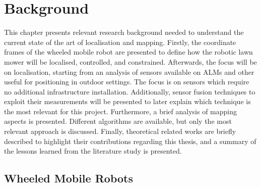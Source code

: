 \chapter{Background}
\label{ch:background}





\noindent This chapter presents relevant research background needed to understand the current state of the art of localisation and mapping.
Firstly, the coordinate frames of the wheeled mobile robot are presented to define how the robotic lawn mower will be localised, controlled, and constrained.
Afterwards, the focus will be on localisation, starting from an analysis of sensors available on \glspl{ALM} and other useful for positioning in outdoor settings.
The focus is on sensors which require no additional infrastructure installation.
Additionally, sensor fusion techniques to exploit their measurements will be presented to later explain which technique is the most relevant for this project.
Furthermore, a brief analysis of mapping aspects is presented.
Different algorithms are available, but only the most relevant approach is discussed.
Finally, theoretical related works are briefly described to highlight their contributions regarding this thesis, and a summary of the lessons learned from the literature study is presented.


\section{Wheeled Mobile Robots}

